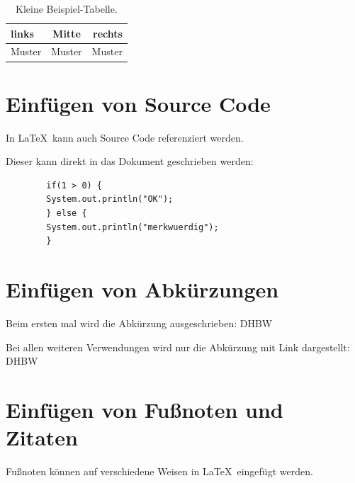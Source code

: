 \begin{table}[htb]
    \centering
    \begin{tabular}{lcr}
        links  & Mitte  & rechts \\
        \hline
        Muster & Muster & Muster \\
    \end{tabular}
    \caption{Kleine Beispiel-Tabelle.}
    \label{tab:BeispielTabelleKlein}
\end{table}

\section{Einfügen von Source Code}\label{section:source_code}

\lstset{language=Java}

In \LaTeX\ kann auch Source Code referenziert werden.

Dieser kann direkt in das Dokument geschrieben werden:

\begin{lstlisting}
        if(1 > 0) {
        System.out.println("OK"); 
        } else {
        System.out.println("merkwuerdig");
        }
    \end{lstlisting}

\section{Einfügen von Abkürzungen}\label{section:abkuerzungen}

Beim ersten mal wird die Abkürzung ausgeschrieben: \ac{DHBW}

Bei allen weiteren Verwendungen wird nur die Abkürzung mit Link dargestellt: \ac{DHBW}

\section{Einfügen von Fußnoten und Zitaten}\label{section:zitate}

Fußnoten können auf verschiedene Weisen in \LaTeX\ eingefügt werden.

